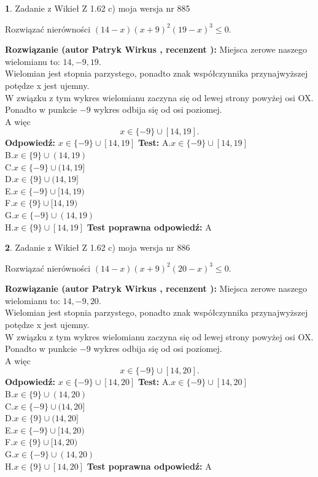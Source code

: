 \documentclass[12pt, a4paper]{article}
\theoremstyle{definition} %
\newtheorem{zad}{}
\newcommand{\zadStart}[1]{\begin{zad}#1\newline}
\newcommand{\zadStop}{\end{zad}}
\newcommand{\rozwStart}[2]{\noindent \textbf{Rozwiązanie (autor #1 , recenzent #2): }\newline}
\newcommand{\rozwStop}{\newline}
\newcommand{\odpStart}{\noindent \textbf{Odpowiedź:}\newline}
\newcommand{\odpStop}{\newline}
\newcommand{\testStart}{\noindent \textbf{Test:}\newline}
\newcommand{\testStop}{\newline}
\newcommand{\kluczStart}{\noindent \textbf{Test poprawna odpowiedź:}\newline}
\newcommand{\kluczStop}{\newline}
\begin{document}
\zadStart{Zadanie z Wikieł Z 1.62 c) moja wersja nr 885}

Rozwiązać nierówności $(14-x)(x+9)^{2}(19-x)^{3}\le0$.
\zadStop
\rozwStart{Patryk Wirkus}{}
Miejsca zerowe naszego wielomianu to: $14, -9, 19$.\\
Wielomian jest stopnia parzystego, ponadto znak współczynnika przy\linebreak najwyższej potędze x jest ujemny.\\ W związku z tym wykres wielomianu zaczyna się od lewej strony powyżej osi OX.\\
Ponadto w punkcie $-9$ wykres odbija się od osi poziomej.\\
A więc $$x \in \{-9\} \cup [14,19].$$
\rozwStop
\odpStart
$x \in \{-9\} \cup [14,19]$
\odpStop
\testStart
A.$x \in \{-9\} \cup [14,19]$\\
B.$x \in \{9\} \cup (14,19)$\\
C.$x \in \{-9\} \cup (14,19]$\\
D.$x \in \{9\} \cup (14,19]$\\
E.$x \in \{-9\} \cup [14,19)$\\
F.$x \in \{9\} \cup [14,19)$\\
G.$x \in \{-9\} \cup (14,19)$\\
H.$x \in \{9\} \cup [14,19]$
\testStop
\kluczStart
A
\kluczStop



\zadStart{Zadanie z Wikieł Z 1.62 c) moja wersja nr 886}

Rozwiązać nierówności $(14-x)(x+9)^{2}(20-x)^{3}\le0$.
\zadStop
\rozwStart{Patryk Wirkus}{}
Miejsca zerowe naszego wielomianu to: $14, -9, 20$.\\
Wielomian jest stopnia parzystego, ponadto znak współczynnika przy\linebreak najwyższej potędze x jest ujemny.\\ W związku z tym wykres wielomianu zaczyna się od lewej strony powyżej osi OX.\\
Ponadto w punkcie $-9$ wykres odbija się od osi poziomej.\\
A więc $$x \in \{-9\} \cup [14,20].$$
\rozwStop
\odpStart
$x \in \{-9\} \cup [14,20]$
\odpStop
\testStart
A.$x \in \{-9\} \cup [14,20]$\\
B.$x \in \{9\} \cup (14,20)$\\
C.$x \in \{-9\} \cup (14,20]$\\
D.$x \in \{9\} \cup (14,20]$\\
E.$x \in \{-9\} \cup [14,20)$\\
F.$x \in \{9\} \cup [14,20)$\\
G.$x \in \{-9\} \cup (14,20)$\\
H.$x \in \{9\} \cup [14,20]$
\testStop
\kluczStart
A
\kluczStop
\end{document}
